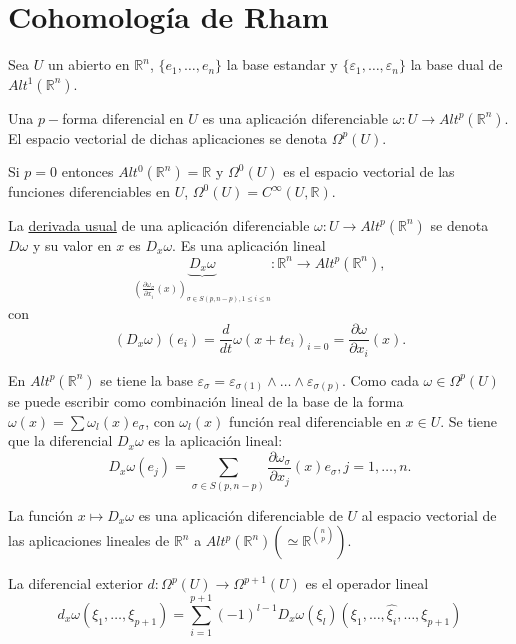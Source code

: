 \chapter{Cohomología de Rham}

Sea $U$ un abierto en $\mathbb{R}^n$, $\{e_1,\dots,e_n\}$ la base estandar y $\{\varepsilon_1,\dots,\varepsilon_n\}$ la base dual de $Alt^1(\mathbb{R}^n)$. 

\begin{Def}
Una $p-$forma diferencial en $U$ es una aplicación diferenciable $\omega:U\rightarrow Alt^p(\mathbb{R}^n)$. El espacio vectorial de dichas aplicaciones se denota $\Omega^p(U)$. 
\end{Def}

Si $p=0$ entonces $Alt^0(\mathbb{R}^n)=\mathbb{R}$ y $\Omega^0(U)$ es el espacio vectorial de las funciones diferenciables en $U$, $\Omega^0(U)=C^\infty(U,\mathbb{R})$. 
\vspace{3mm}

La \underline{derivada usual} de una aplicación diferenciable $\omega:U\rightarrow Alt^p(\mathbb{R}^n)$ se denota $D\omega$ y su valor en $x$ es $D_x\omega $. Es una aplicación lineal
$$\underbrace{D_x\omega}_{(\frac{\partial \omega_\sigma}{\partial x_i}(x))_{\sigma\in S(p,n-p),1\le i \le n}}:\mathbb{R}^n\rightarrow Alt^p(\mathbb{R}^n),$$
con
$$(D_x\omega)(e_i)=\frac{d}{dt}\omega(x+te_i)_{i=0}=\frac{\partial \omega}{\partial x_i}(x). $$
\vspace{3mm}


En $Alt^p(\mathbb{R}^n)$ se tiene la base $\varepsilon_\sigma=\varepsilon_{\sigma(1)}\wedge \dots \wedge \varepsilon_{\sigma(p)}$. Como cada $\omega\in \Omega^p(U)$ se puede escribir como combinación lineal de la base de la forma $\omega(x)=\sum \omega_l(x)e_\sigma $, con $\omega_l(x)$ función real diferenciable en $x\in U$. Se tiene que la diferencial $D_x\omega $ es la aplicación lineal:
$$D_x\omega(e_j) =\sum_{\sigma\in S(p,n-p)}\frac{\partial \omega_\sigma}{\partial x_j}(x)e_\sigma, j=1,\dots, n.$$

La función $x\mapsto D_x\omega $ es una aplicación diferenciable de $U$ al espacio vectorial de las aplicaciones lineales de $\mathbb{R}^n$ a $Alt^p(\mathbb{R}^n)(\simeq \mathbb{R}^{{n \choose p}})$.

\newpage
\begin{Def}
La diferencial exterior $d:\Omega^p(U)\rightarrow \Omega^{p+1}(U)$ es el operador lineal
\begin{equation}
  \label{eq:ec2}
  d_x\omega(\xi_1,\dots,\xi_{p+1}) = \sum_{i=1}^{p+1}(-1)^{l-1}D_x\omega(\xi_l)(\xi_1,\dots,\hat{\xi_i},\dots,\xi_{p+1})
\end{equation}

\end{Def}



